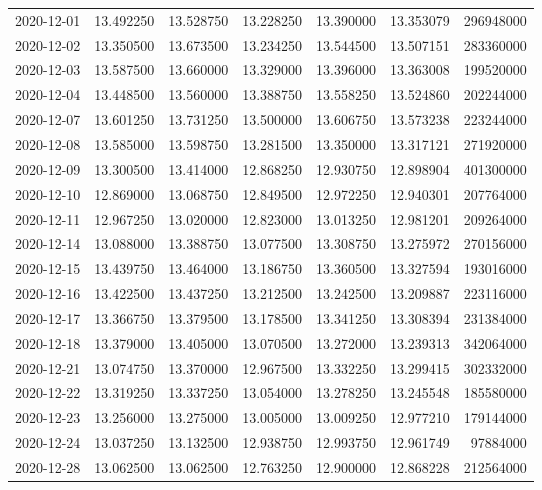 \begin{tabular}{lrrrrrr}
2020-12-01 &   13.492250 &   13.528750 &   13.228250 &   13.390000 &   13.353079 &   296948000 \\
2020-12-02 &   13.350500 &   13.673500 &   13.234250 &   13.544500 &   13.507151 &   283360000 \\
2020-12-03 &   13.587500 &   13.660000 &   13.329000 &   13.396000 &   13.363008 &   199520000 \\
2020-12-04 &   13.448500 &   13.560000 &   13.388750 &   13.558250 &   13.524860 &   202244000 \\
2020-12-07 &   13.601250 &   13.731250 &   13.500000 &   13.606750 &   13.573238 &   223244000 \\
2020-12-08 &   13.585000 &   13.598750 &   13.281500 &   13.350000 &   13.317121 &   271920000 \\
2020-12-09 &   13.300500 &   13.414000 &   12.868250 &   12.930750 &   12.898904 &   401300000 \\
2020-12-10 &   12.869000 &   13.068750 &   12.849500 &   12.972250 &   12.940301 &   207764000 \\
2020-12-11 &   12.967250 &   13.020000 &   12.823000 &   13.013250 &   12.981201 &   209264000 \\
2020-12-14 &   13.088000 &   13.388750 &   13.077500 &   13.308750 &   13.275972 &   270156000 \\
2020-12-15 &   13.439750 &   13.464000 &   13.186750 &   13.360500 &   13.327594 &   193016000 \\
2020-12-16 &   13.422500 &   13.437250 &   13.212500 &   13.242500 &   13.209887 &   223116000 \\
2020-12-17 &   13.366750 &   13.379500 &   13.178500 &   13.341250 &   13.308394 &   231384000 \\
2020-12-18 &   13.379000 &   13.405000 &   13.070500 &   13.272000 &   13.239313 &   342064000 \\
2020-12-21 &   13.074750 &   13.370000 &   12.967500 &   13.332250 &   13.299415 &   302332000 \\
2020-12-22 &   13.319250 &   13.337250 &   13.054000 &   13.278250 &   13.245548 &   185580000 \\
2020-12-23 &   13.256000 &   13.275000 &   13.005000 &   13.009250 &   12.977210 &   179144000 \\
2020-12-24 &   13.037250 &   13.132500 &   12.938750 &   12.993750 &   12.961749 &    97884000 \\
2020-12-28 &   13.062500 &   13.062500 &   12.763250 &   12.900000 &   12.868228 &   212564000 \\

\end{tabular}
